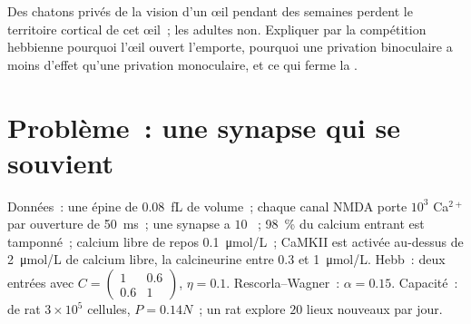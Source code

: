 \begin{exercise}[$\star\star\star$]\label{exo:b3:learning-memory:12}
Des chatons privés de la vision d'un œil pendant des semaines perdent le
territoire cortical de cet œil~; les adultes non. Expliquer par la
compétition hebbienne pourquoi l'œil ouvert l'emporte, pourquoi une
privation binoculaire a moins d'effet qu'une privation monoculaire, et
ce qui ferme la .
\end{exercise}

\section{Problème~: une synapse qui se souvient}

\begin{problem}
\label{pb:b3:learning-memory:1}
Données~: une épine de \qty{0.08}{fL} de volume~; chaque canal NMDA
porte $10^{3}$ Ca$^{2+}$ par ouverture de \qty{50}{ms}~; une synapse a
$10$ ~; \qty{98}{\%} du calcium entrant est tamponné~;
calcium libre de repos \qty{0.1}{\micro mol/L}~; CaMKII est activée
au-dessus de \qty{2}{\micro mol/L} de calcium libre, la calcineurine
entre $0.3$ et \qty{1}{\micro mol/L}. Hebb~: deux entrées avec
$C = \begin{pmatrix}1 &
0.6\\ 0.6 & 1\end{pmatrix}$, $\eta = 0.1$. Rescorla--Wagner~: $\alpha =
0.15$. Capacité~:  de rat $3\times 10^{5}$ cellules, $P = 0.14N$~; un
rat explore $20$ lieux nouveaux par jour.


\end{problem}
